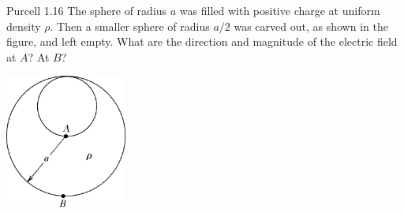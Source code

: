\documentclass{esg8022pset}
\begin{document}
\begin{problem}{Purcell 1.16}
  The sphere of radius $a$ was filled with positive charge at uniform density $\rho$. Then a smaller sphere of radius $a/2$ was carved out, as shown in the figure, and left empty. What are the direction and magnitude of the electric field at $A$? At $B$?
  \begin{center}\includegraphics[width=0.3\textwidth]{ps02_1}\end{center}
\end{problem}
\end{document}
